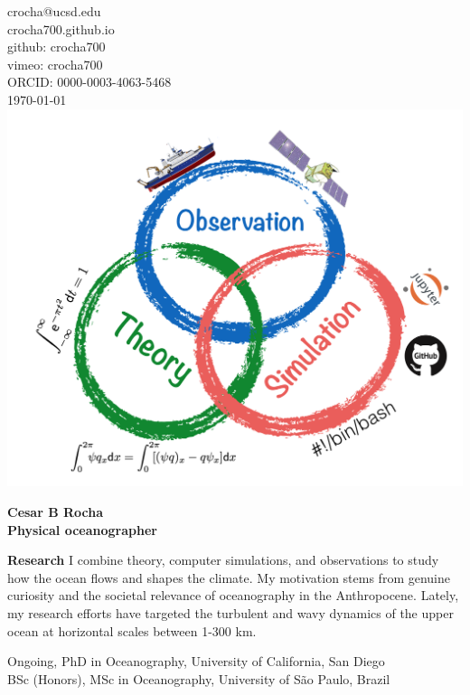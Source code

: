 \documentclass[a4paper,11pt,final]{memoir}
\newcommand{\Sep}{\vspace{1.25em}}
\newcommand{\SmallSep}{\vspace{0.5em}}
\newenvironment{Research}
    {\ignorespaces\textbf{\color{NavyBlue} Research}}
\newcommand{\CVSection}[1]
    {\Large\textbf{#1}\par
    \SmallSep\normalsize\normalfont}
\begin{document}
%

\begin{flushright}\small
    crocha@ucsd.edu\\[.1cm]
    crocha700.github.io\\[.1cm]
    github: crocha700\\[.1cm]
    vimeo: crocha700\\[.1cm]
    ORCID: 0000-0003-4063-5468\\[.1cm]
    \textcolor[gray]{0.45}{\mydate\today}\\[.1cm]
    \includegraphics[width=.185\textwidth]{theory_comp_obs2.png}
\end{flushright}\normalsize
\framebreak

\Huge\bfseries { \color{NavyBlue}  Cesar B Rocha} \\
\Large\bfseries Physical oceanographer \\

\normalsize\normalfont

\begin{Research}
I combine theory, computer simulations, and observations to study how the ocean flows and shapes the climate.
My motivation stems from genuine curiosity and the societal relevance
of oceanography in the Anthropocene. Lately, my research efforts have
targeted the turbulent and wavy dynamics of the upper ocean at horizontal scales between 1-300 km.

\end{Research}

\Sep


Ongoing, PhD in Oceanography, University of California, San Diego \\
BSc (Honors), MSc in Oceanography, University of S\~ao Paulo, Brazil

\Sep

\end{document}
